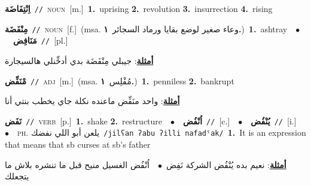 \documentclass[10pt,a4paper,twoside]{article} %
\begin{document}
\begin{multicols}{2}
{\setlength\topsep{0pt}\textbf{\foreignlanguage{arabic}{اِنْتِفَاضَة}}\ {\color{gray}\texttt{//}\color{black}}\ \textsc{noun}\ [m.]\ \textbf{1.}~uprising  \textbf{2.}~revolution  \textbf{3.}~insurrection  \textbf{4.}~rising\ } \vspace{2mm}

{\setlength\topsep{0pt}\textbf{\foreignlanguage{arabic}{مِنْفَضَة}}\ {\color{gray}\texttt{//}\color{black}}\ \textsc{noun}\ [f.]\ \color{gray}(msa. \foreignlanguage{arabic}{وعاء صغير لوضع بقايا ورماد السجائر}~\foreignlanguage{arabic}{\textbf{١.}})\color{black}\ \textbf{1.}~ashtray\ \ $\bullet$\ \ \setlength\topsep{0pt}\textbf{\foreignlanguage{arabic}{مَنَافِض}}\ {\color{gray}\texttt{//}\color{black}}\ [pl.]\  \begin{flushright}\color{gray}\foreignlanguage{arabic}{\textbf{\underline{\foreignlanguage{arabic}{أمثلة}}}: جيبلي مِنْفَضَة بدي أدخِّنلي هالسيجارة}\end{flushright}\color{black}} \vspace{2mm}

{\setlength\topsep{0pt}\textbf{\foreignlanguage{arabic}{مْنَفِّض}}\ {\color{gray}\texttt{//}\color{black}}\ \textsc{adj}\ [m.]\ \color{gray}(msa. \foreignlanguage{arabic}{مُفْلِس}~\foreignlanguage{arabic}{\textbf{١.}})\color{black}\ \textbf{1.}~penniless  \textbf{2.}~bankrupt\  \begin{flushright}\color{gray}\foreignlanguage{arabic}{\textbf{\underline{\foreignlanguage{arabic}{أمثلة}}}: واحد منَفِّض ماعنده نكلة جاي يخطب بنتي أنا}\end{flushright}\color{black}} \vspace{2mm}

{\setlength\topsep{0pt}\textbf{\foreignlanguage{arabic}{نَفَض}}\ {\color{gray}\texttt{//}\color{black}}\ \textsc{verb}\ [p.]\ \textbf{1.}~shake  \textbf{2.}~restructure\ \ $\bullet$\ \ \setlength\topsep{0pt}\textbf{\foreignlanguage{arabic}{اُنْفُض}}\ {\color{gray}\texttt{//}\color{black}}\ [c.]\ \ $\bullet$\ \ \setlength\topsep{0pt}\textbf{\foreignlanguage{arabic}{يُنْفُض}}\ {\color{gray}\texttt{//}\color{black}}\ [i.]\ \ $\bullet$\ \ \textsc{ph.} \color{gray} \foreignlanguage{arabic}{يلعن أبو اللي نفضك}\color{black}\ {\color{gray}\texttt{/{\sffamily jilʕan ʔabu ʔilli nafadˤak}/}\color{black}}\ \textbf{1.}~It is an expression that means that sb curses at sb's father\  \begin{flushright}\color{gray}\foreignlanguage{arabic}{\textbf{\underline{\foreignlanguage{arabic}{أمثلة}}}: نعيم بده يُنْفُض الشركة نَفِض\ $\bullet$\ \  اُنْفُض الغسيل منيح قبل ما تنشره بلاش ما يتجعلك}\end{flushright}\color{black}} \vspace{2mm}


\end{multicols}
\end{document}
